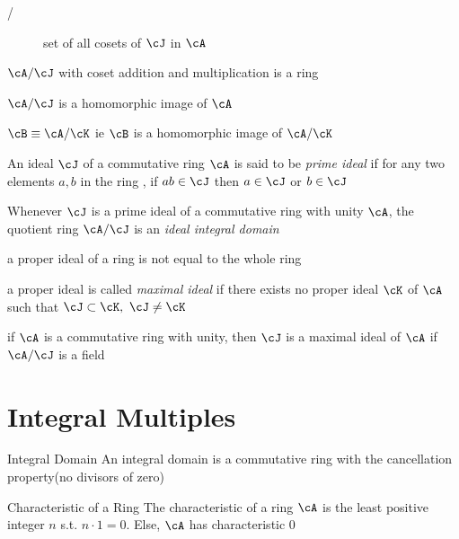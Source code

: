 \documentclass[11pt, oneside, dvipdfmx]{book}
\begin{document}
\begin{description}
\item[\cA/\cJ] set of all cosets of $\cJ$ in $\cA$
\end{description}

\begin{MyTheorem}
$\cA/\cJ$ with coset addition and multiplication is a ring 
\end{MyTheorem}

\begin{MyTheorem}
$\cA/\cJ$ is a homomorphic image of $\cA$
\end{MyTheorem}

\begin{MyTheorem}
$\cB \equiv \cA/\cK$ ie $\cB$ is a homomorphic image of $\cA/\cK$ 
\end{MyTheorem}

\begin{description}
\item An ideal $\cJ$ of a commutative ring $\cA$ is said to be \textit{prime ideal} if for any two elements $a,b$ in the ring , if $ab \in \cJ$ then $a\in \cJ$ or $b\in \cJ$

\item Whenever $\cJ$ is a prime ideal of a  commutative ring with unity $\cA$, the quotient ring $\cA/\cJ$ is an \textit{ideal integral domain}

\item a proper ideal of a ring is not equal to the whole ring

\item a proper ideal is called \textit{maximal ideal} if there exists no proper ideal $\cK$ of $\cA$ such that $\cJ \subset \cK,~ \cJ \neq \cK$

\item if $\cA$ is a commutative ring with unity, then $\cJ$ is a maximal ideal of $\cA$ if $\cA/\cJ$ is a field
\end{description}

\section{Integral Multiples}
\begin{MyDefinition}{Integral Domain}
An integral domain is a commutative ring with the cancellation property(no divisors of zero)
\end{MyDefinition}

\begin{MyDefinition}{Characteristic of a Ring}
The characteristic of a ring $\cA$ is the least positive integer $n$ s.t. 
$n\cdot 1 = 0$. Else, $\cA$ has characteristic $0$
\end{MyDefinition}
\end{document}
